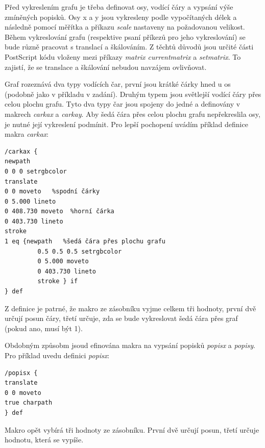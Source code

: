 \documentclass 	[a4paper,12pt]	{article}
\begin{document}
Před vykreslením grafu je třeba definovat osy, vodící čáry a vypsání výše zmíněných popisků. Osy x a y jsou vykresleny podle vypočítaných délek a následně pomocí měřítka a příkazu \emph{scale} nastaveny na požadovanou velikost. Během vykreslování grafu (respektive psaní příkezů pro jeho vykreslování) se bude různě pracovat s translací a škálováním. Z těchtů důvodů jsou určité části PostScript kódu vloženy mezi příkazy \emph{matrix currentmatrix} a \emph{setmatrix}. To zajistí, že se translace a škálování nebudou navzájem ovlivňovat.

Graf rozeznává dva typy vodících čar, první jsou krátké čárky hned u os (podobně jako v příkladu v zadání). Druhým typem jsou světlejší vodící čáry přes celou plochu grafu. Tyto dva typy čar jsou spojeny do jedné a definovány v makrech \emph{carkax} a \emph{carkay}. Aby šedá čára přes celou plochu grafu nepřekreslila osy, je nutné její vykreslení podmínit. Pro lepší pochopení uvádím příklad definice makra \emph{carkax}:
\begin{verbatim}
/carkax {
newpath 
0 0 0 setrgbcolor 
translate 
0 0 moveto   %spodní čárky
0 5.000 lineto 
0 408.730 moveto  %horní čárka
0 403.730 lineto 
stroke 
1 eq {newpath   %šedá čára přes plochu grafu
         0.5 0.5 0.5 setrgbcolor 
         0 5.000 moveto 
         0 403.730 lineto 
         stroke } if
} def 
\end{verbatim}
Z definice je patrné, že makro ze zásobníku vyjme celkem tři hodnoty, první dvě určují posun čáry, třetí určuje, zda se bude vykreslovat šedá čára přes graf (pokud ano, musí být 1).

Obdobným způsobm jsoud efinována makra na vypsání popisků \emph{popisx} a \emph{popisy}. Pro příklad uvedu definici \emph{popisx}:
\begin{verbatim}
/popisx {
translate 
0 0 moveto 
true charpath 
} def
\end{verbatim}

Makro opět vybírá tři hodnoty ze zásobníku. První dvě určují posun, třetí určuje hodnotu, která se vypíše.
\end{document}
